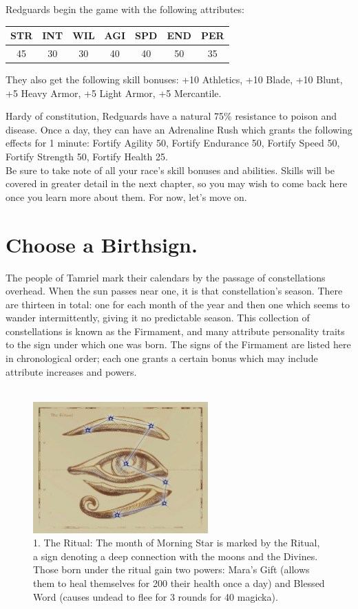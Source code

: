 \documentclass[12pt]{book}
\begin{document}
Redguards begin the game with the following attributes:
\begin{center}
\begin{tabular}{|c|c|c|c|c|c|c|}
\hline
STR & INT & WIL & AGI & SPD & END & PER\\ \hline
45 & 30 & 30 & 40 & 40 & 50 & 35\\ \hline
\end{tabular}
\end{center}

They also get the following skill bonuses: +10 Athletics, +10 Blade, +10 Blunt, +5 Heavy Armor, +5 Light Armor, +5 Mercantile.

Hardy of constitution, Redguards have a natural 75\% resistance to poison and disease. Once a day, they can have an Adrenaline Rush which grants the following effects for 1 minute: Fortify Agility 50, Fortify Endurance 50, Fortify Speed 50, Fortify Strength 50, Fortify Health 25.\\

Be sure to take note of all your race's skill bonuses and abilities. Skills will be covered in greater detail in the next chapter, so you may wish to come back here once you learn more about them. For now, let's move on.
\section{Choose a Birthsign.}
The people of Tamriel mark their calendars by the passage of constellations overhead. When the sun passes near one, it is that constellation's season. There are thirteen in total: one for each month of the year and then one which seems to wander intermittently, giving it no predictable season. This collection of constellations is known as the Firmament, and many attribute personality traits to the sign under which one was born. The signs of the Firmament are listed here in chronological order; each one grants a certain bonus which may include attribute increases and powers.\\~\\

\begin{figure}[H]
\includegraphics[width=0.6\textwidth]{Ritual.png}
\centering
\caption*{1. The Ritual: The month of Morning Star is marked by the Ritual, a sign denoting a deep connection with the moons and the Divines. Those born under the ritual gain two powers: Mara's Gift (allows them to heal themselves for 200 their health once a day) and Blessed Word (causes undead to flee for 3 rounds for 40 magicka).}
\end{figure}
\end{document}
